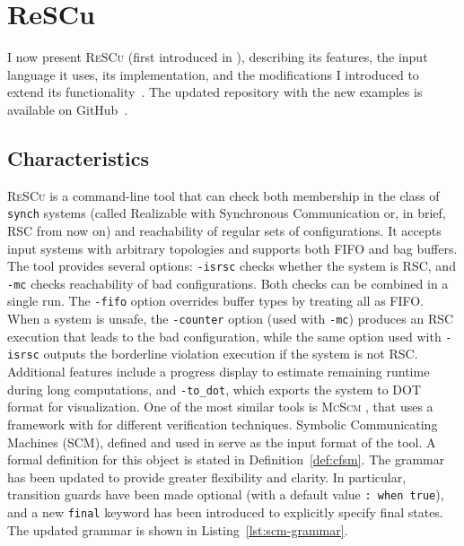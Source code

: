 \chapter{ReSCu}\label{sec:rescu}
I now present \textsc{ReSCu} (first introduced in \cite{desgeorges2023rsc, di2023multiparty, guizouarn2023communicating}),
describing its features, the input
language it uses, its implementation, and the modifications I introduced to
extend its functionality~\cite{rescuoriginalrepo}. The updated repository with 
the new examples is available on GitHub~\cite{rescurepo}.

\section{Characteristics}
\textsc{ReSCu} is a command-line tool that can check both membership in the 
class of \verb|synch| systems (called Realizable with Synchronous Communication 
or, in brief, RSC from now on) and reachability of regular sets of configurations. It 
accepts input systems with arbitrary topologies and supports both FIFO and 
bag buffers. The tool provides several options: 
\verb|-isrsc| checks whether the system is RSC, and \verb|-mc| checks reachability of 
bad configurations. Both checks can be combined in a single run. The \verb|-fifo| option 
overrides buffer types by treating all as FIFO. When a system is unsafe, the 
\verb|-counter| option (used with \verb|-mc|) produces an RSC execution that leads 
to the bad configuration, while the same option used with \verb|-isrsc| outputs the 
borderline violation execution if the system is not RSC. Additional features include 
a progress display to estimate remaining runtime during long computations, and 
\verb|-to_dot|, which exports the system to DOT format for visualization.
One of the most similar tools is \textsc{McScm} \cite{heussner2012mcscm}, that
uses a framework with for different verification techniques. 
Symbolic Communicating Machines (SCM), defined and used in \cite{brand1983communicating} 
serve as the input format of the tool.
A formal definition for this object is stated in Definition~\ref{def:cfsm}.
The grammar has been updated to provide greater flexibility and clarity. In
particular, transition guards have been made optional (with a default value
\verb|: when true|), and a new \verb|final| keyword has been introduced to
explicitly specify final states. The updated grammar is shown in
Listing~\ref{lst:scm-grammar}. 


